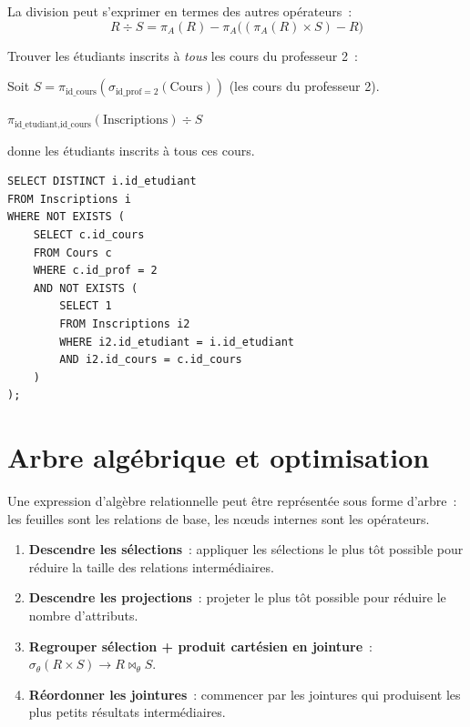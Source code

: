 \begin{theoreme}
La division peut s'exprimer en termes des autres op\'erateurs~:
\[
R \div S = \pi_A(R) - \pi_A\big((\pi_A(R) \times S) - R\big)
\]
\end{theoreme}

\begin{exemple}
Trouver les \'etudiants inscrits \`a \emph{tous} les cours du professeur 2~:

Soit $S = \pi_{\text{id\_cours}}(\sigma_{\text{id\_prof}=2}(\text{Cours}))$
(les cours du professeur 2).

$\pi_{\text{id\_etudiant}, \text{id\_cours}}(\text{Inscriptions}) \div S$

donne les \'etudiants inscrits \`a tous ces cours.

\begin{codeblock}[title=\textbf{Division en SQL (NOT EXISTS)}]
\begin{verbatim}
SELECT DISTINCT i.id_etudiant
FROM Inscriptions i
WHERE NOT EXISTS (
    SELECT c.id_cours
    FROM Cours c
    WHERE c.id_prof = 2
    AND NOT EXISTS (
        SELECT 1
        FROM Inscriptions i2
        WHERE i2.id_etudiant = i.id_etudiant
        AND i2.id_cours = c.id_cours
    )
);
\end{verbatim}
\end{codeblock}
\end{exemple}

\section{Arbre alg\'ebrique et optimisation}

Une expression d'alg\`ebre relationnelle peut \^etre repr\'esent\'ee sous forme
d'arbre~: les feuilles sont les relations de base, les n\oe{}uds internes
sont les op\'erateurs.

\begin{theoreme}
\begin{enumerate}
    \item \textbf{Descendre les s\'elections}~: appliquer les s\'elections le plus
          t\^ot possible pour r\'eduire la taille des relations interm\'ediaires.
    \item \textbf{Descendre les projections}~: projeter le plus t\^ot possible
          pour r\'eduire le nombre d'attributs.
    \item \textbf{Regrouper s\'election + produit cart\'esien en jointure}~:
          $\sigma_\theta(R \times S) \to R \bowtie_\theta S$.
    \item \textbf{R\'eordonner les jointures}~: commencer par les jointures
          qui produisent les plus petits r\'esultats interm\'ediaires.
\end{enumerate}
\end{theoreme}

